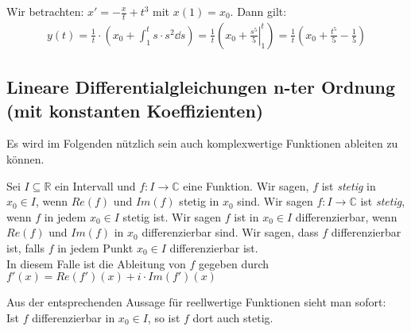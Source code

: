 \begin{Beispiel}{
	Wir betrachten: $x' = -\frac{x}{t} + t^3$ mit $x(1) = x_0$. Dann gilt:
	\begin{align*}
		y(t) = \frac{1}{t}\cdot\left(x_0 + \int_1^t s \cdot s^2 \dd{s} \right)
		= \frac{1}{t} \left(x_0 + \left.\frac{s^5}{5}\right\vert_1^t\right)
		= \frac{1}{t}\left(x_0 + \frac{t^5}{5} - \frac{1}{5}\right)
	\end{align*}
}\end{Beispiel}

\subsection{Lineare Differentialgleichungen n-ter Ordnung (mit konstanten Koeffizienten)}
Es wird im Folgenden nützlich sein auch komplexwertige Funktionen ableiten zu können.

\begin{Definition}{
	Sei $I \subseteq \mathbb{R}$ ein Intervall und $f: I \rightarrow \mathbb{C}$ 
	eine Funktion. Wir sagen, $f$ ist \emph{stetig} in $x_0 \in I$, wenn 
	$Re(f)$ und $Im(f)$ stetig in $x_0$ sind. Wir sagen $f: I \rightarrow \mathbb{C} 
	$ ist \emph{stetig}, wenn $f$ in jedem $x_0 \in I$ stetig ist. Wir sagen 
	$f$ ist in $x_0 \in I$ differenzierbar, wenn $Re(f)$ und $Im(f)$ in $x_0$
	 differenzierbar sind. Wir sagen, dass $f$ differenzierbar ist, falls $f$ in 
	 jedem Punkt $x_0 \in I$ differenzierbar ist.\\
	 In diesem Falle ist die Ableitung von $f$ gegeben durch $f'(x) = Re(f')(x) 
	 +i \cdot  Im(f') (x) $
}\end{Definition}

\begin{Bemerkung}{
	Aus der entsprechenden Aussage für reellwertige Funktionen sieht man sofort: \\
	Ist $f$ differenzierbar in $x_0 \in I$, so ist $f$ dort auch stetig.
}\end{Bemerkung}

